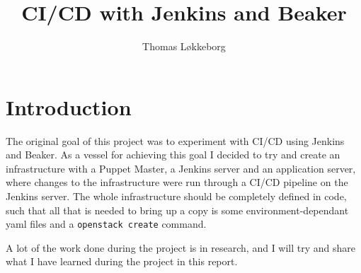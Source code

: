 

\title{CI/CD with Jenkins and Beaker}
\author{Thomas Løkkeborg} %



\maketitle


\thispagestyle{empty}

\clearpage
{}
\setcounter{page}{1}
\tableofcontents

\clearpage
{}

\section{Introduction}

The original goal of this project was to experiment with CI/CD using Jenkins and Beaker. As a vessel for achieving this goal I decided to try and create an infrastructure with a Puppet Master, a Jenkins server and an application server, where changes to the infrastructure were run through a CI/CD pipeline on the Jenkins server. The whole infrastructure should be completely defined in code, such that all that is needed to bring up a copy is some environment-dependant yaml files and a \texttt{openstack create} command.

A lot of the work done during the project is in research, and I will try and share what I have learned during the project in this report. 

